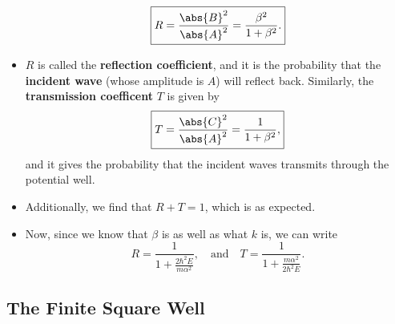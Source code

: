 \begin{itemize}
\begin{equation}
            \boxed{R = \frac{\abs{B}^2}{\abs{A}^2} = \frac{\beta^2}{1 + \beta^2}.}
        \end{equation}
    \item $R$ is called the \textbf{reflection coefficient}, and it is the probability that the \textbf{incident wave} (whose amplitude is $A$) will reflect back. Similarly, the \textbf{transmission coefficent} $T$ is given by
        \begin{equation}
            \boxed{T = \frac{\abs{C}^2}{\abs{A}^2} = \frac{1}{1+\beta^2},}
        \end{equation}
        and it gives the probability that the incident waves transmits through the potential well.
    \item Additionally, we find that $R+T=1$, which is as expected.
    \item Now, since we know that $\beta$ is as well as what $k$ is, we can write
        \begin{equation}
            \boxed{R = \frac{1}{1+\frac{2\hbar^2 E}{m\alpha^2}},} \quad \mathrm{and} \quad \boxed{T = \frac{1}{1 + \frac{m\alpha^2}{2\hbar^2 E}}.}
        \end{equation}
\end{itemize}



\subsection*{The Finite Square Well}

